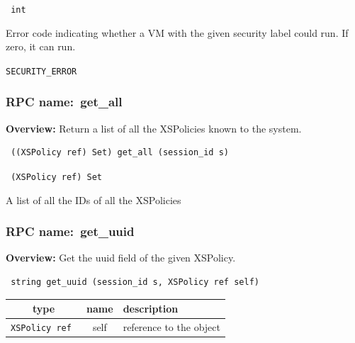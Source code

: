 \vspace{0.3cm}

{\tt
int
}


Error code indicating whether a VM with the given security label could run.
If zero, it can run.

\vspace{0.3cm}

 {\tt SECURITY\_ERROR}

\subsubsection{RPC name:~get\_all}

{\bf Overview:}
Return a list of all the XSPolicies known to the system.

\begin{verbatim} ((XSPolicy ref) Set) get_all (session_id s)\end{verbatim}


\vspace{0.3cm}

{\tt
(XSPolicy ref) Set
}


A list of all the IDs of all the XSPolicies
\vspace{0.3cm}
\vspace{0.3cm}
\vspace{0.3cm}
\subsubsection{RPC name:~get\_uuid}

{\bf Overview:}
Get the uuid field of the given XSPolicy.

\begin{verbatim} string get_uuid (session_id s, XSPolicy ref self)\end{verbatim}




\vspace{0.3cm}
\begin{tabular}{|c|c|p{7cm}|}
 \hline
{\bf type} & {\bf name} & {\bf description} \\ \hline
{\tt XSPolicy ref } & self & reference to the object \\ \hline

\end{tabular}

\vspace{0.3cm}

